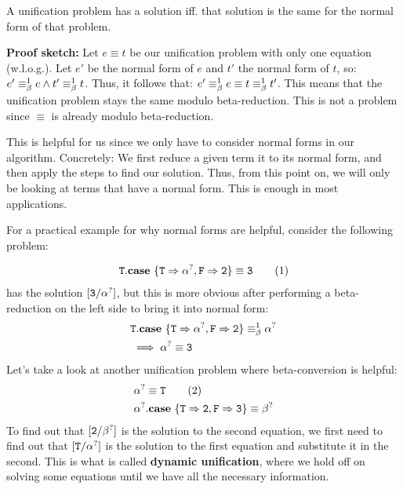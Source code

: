 \documentclass[twoside,12pt,a4paper]{article}
\begin{document}
\begin{theorem}
    A unification problem has a solution iff. that solution is the same for the normal form of that problem. 
    
    \textbf{Proof sketch:} Let $e \equiv t$ be our unification problem with only one equation (w.l.o.g.).
    Let $e'$ be the normal form of $e$ and $t'$ the normal form of $t$, so: $e'\equiv_{\beta}^1 e \land t'\equiv_{\beta}^1 t$.
    Thus, it follows that: $e' \equiv_{\beta}^1 e \equiv t \equiv_{\beta}^1 t'$. This means that the unification problem stays the same modulo beta-reduction.
    This is not a problem since $\equiv$ is already modulo beta-reduction. 
\end{theorem}

This is helpful for us since we only have to consider normal forms in our algorithm.
Concretely: We first reduce a given term it to its normal form, and then apply the steps to find our solution.
Thus, from this point on, we will only be looking at terms that have a normal form. This is enough in most applications.

For a practical example for why normal forms are helpful, consider the following problem:
\begin{example}
    \begin{align*}
        \mathtt{T}.\textbf{case}\ \{\mathtt{T} \Rightarrow \alpha^?, \mathtt{F} \Rightarrow \mathtt{2}\} \equiv \mathtt{3} \tag{1}
    \end{align*}
    has the solution $[\mathtt{3/\alpha^?}]$, but this is more obvious after performing a beta-reduction on the left side 
    to bring it into normal form:
    \begin{align*}
        &\mathtt{T}.\textbf{case}\ \{\mathtt{T} \Rightarrow \alpha^?, \mathtt{F} \Rightarrow \mathtt{2}\} \equiv_{\beta}^1 \alpha^?\\
        &\implies \alpha^? \equiv \mathtt{3}   
    \end{align*}       
Let's take a look at another unification problem where beta-conversion is helpful:
\begin{align*}
    &\alpha^? \equiv \mathtt{T} \tag{2}\\
    &\alpha^?.\textbf{case}\ \{\mathtt{T\Rightarrow 2, F\Rightarrow 3}\} \equiv \beta^?
\end{align*}
To find out that $[\mathtt{2}/\beta^?]$ is the solution to the second equation, we first need to find out that
$[\mathtt{T}/\alpha^?]$ is the solution to the first equation and substitute it in the second.
This is what is called \textbf{dynamic unification}, where we hold off on solving some equations 
until we have all the necessary information. 
 
\end{example}
\end{document}
